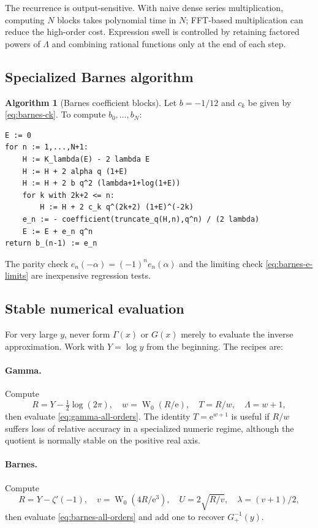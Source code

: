 \documentclass[11pt,oneside]{article}
\theoremstyle{plain}
\theoremstyle{definition}
\newtheorem{algorithm}[theorem]{Algorithm}
\theoremstyle{remark}
\newcommand{\W}{\operatorname{W}}
\newcommand{\e}{\mathrm{e}}
\begin{document}
The recurrence is output-sensitive.  With naive dense series multiplication,
computing \(N\) blocks takes polynomial time in \(N\); FFT-based multiplication
can reduce the high-order cost.  Expression swell is controlled by retaining
factored powers of \(\Lambda\) and combining rational functions only at the
end of each step.

\subsection{Specialized Barnes algorithm}

\begin{algorithm}[Barnes coefficient blocks]
\label{alg:barnes}
Let \(b=-1/12\) and \(c_k\) be given by \cref{eq:barnes-ck}.  To compute
\(b_0,\ldots,b_N\):
\begin{lstlisting}
E := 0
for n := 1,...,N+1:
    H := K_lambda(E) - 2 lambda E
    H := H + 2 alpha q (1+E)
    H := H + 2 b q^2 (lambda+1+log(1+E))
    for k with 2k+2 <= n:
        H := H + 2 c_k q^(2k+2) (1+E)^(-2k)
    e_n := - coefficient(truncate_q(H,n),q^n) / (2 lambda)
    E := E + e_n q^n
return b_(n-1) := e_n
\end{lstlisting}
The parity check \(e_n(-\alpha)=(-1)^ne_n(\alpha)\) and the limiting check
\cref{eq:barnes-e-limits} are inexpensive regression tests.
\end{algorithm}

\subsection{Stable numerical evaluation}

For very large \(y\), never form \(\Gamma(x)\) or \(G(x)\) merely to evaluate
the inverse approximation.  Work with \(Y=\log y\) from the beginning.  The
recipes are:

\paragraph{Gamma.}
Compute
\[
 R=Y-\tfrac12\log(2\pi),\quad
 w=\W_0(R/\e),\quad T=R/w,\quad \Lambda=w+1,
\]
then evaluate \cref{eq:gamma-all-orders}.  The identity \(T=\e^{w+1}\) is
useful if \(R/w\) suffers loss of relative accuracy in a specialized numeric
regime, although the quotient is normally stable on the positive real axis.

\paragraph{Barnes.}
Compute
\[
 R=Y-\zeta'(-1),\quad
 v=\W_0(4R/\e^3),\quad
 U=2\sqrt{R/v},\quad \lambda=(v+1)/2,
\]
then evaluate \cref{eq:barnes-all-orders} and add one to recover
\(G_+^{-1}(y)\).
\end{document}
